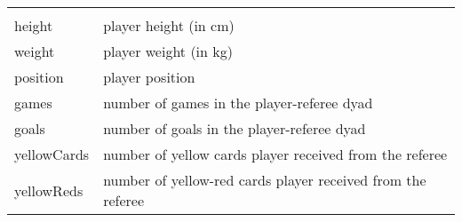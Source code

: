 \documentclass[11pt]{article}
\begin{document}
\begin{longtable}[]{@{}ll@{}}
\begin{minipage}[t]{0.04\columnwidth}
\end{minipage}\tabularnewline
\begin{minipage}[t]{0.04\columnwidth}\raggedright\strut
height\strut
\end{minipage} & \begin{minipage}[t]{0.04\columnwidth}\raggedright\strut
player height (in cm)\strut
\end{minipage}\tabularnewline
\begin{minipage}[t]{0.04\columnwidth}\raggedright\strut
weight\strut
\end{minipage} & \begin{minipage}[t]{0.04\columnwidth}\raggedright\strut
player weight (in kg)\strut
\end{minipage}\tabularnewline
\begin{minipage}[t]{0.04\columnwidth}\raggedright\strut
position\strut
\end{minipage} & \begin{minipage}[t]{0.04\columnwidth}\raggedright\strut
player position\strut
\end{minipage}\tabularnewline
\begin{minipage}[t]{0.04\columnwidth}\raggedright\strut
games\strut
\end{minipage} & \begin{minipage}[t]{0.04\columnwidth}\raggedright\strut
number of games in the player-referee dyad\strut
\end{minipage}\tabularnewline
\begin{minipage}[t]{0.04\columnwidth}\raggedright\strut
goals\strut
\end{minipage} & \begin{minipage}[t]{0.04\columnwidth}\raggedright\strut
number of goals in the player-referee dyad\strut
\end{minipage}\tabularnewline
\begin{minipage}[t]{0.04\columnwidth}\raggedright\strut
yellowCards\strut
\end{minipage} & \begin{minipage}[t]{0.04\columnwidth}\raggedright\strut
number of yellow cards player received from the referee\strut
\end{minipage}\tabularnewline
\begin{minipage}[t]{0.04\columnwidth}\raggedright\strut
yellowReds\strut
\end{minipage} & \begin{minipage}[t]{0.04\columnwidth}\raggedright\strut
number of yellow-red cards player received from the referee\strut

\end{minipage}
\end{longtable}
\end{document}
